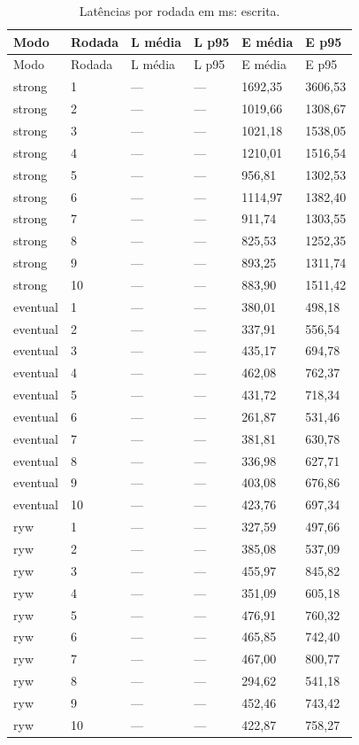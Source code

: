 \begingroup\small\setlength{\tabcolsep}{4pt}
\begin{longtable}{llllll}
\caption{Latências por rodada em ms: escrita.}\\
\toprule
Modo & Rodada & L média & L p95 & E média & E p95\\\midrule\endfirsthead
\toprule
Modo & Rodada & L média & L p95 & E média & E p95\\\midrule\endhead
\bottomrule\endfoot
strong & 1 & --- & --- & 1692,35 & 3606,53\\
strong & 2 & --- & --- & 1019,66 & 1308,67\\
strong & 3 & --- & --- & 1021,18 & 1538,05\\
strong & 4 & --- & --- & 1210,01 & 1516,54\\
strong & 5 & --- & --- & 956,81 & 1302,53\\
strong & 6 & --- & --- & 1114,97 & 1382,40\\
strong & 7 & --- & --- & 911,74 & 1303,55\\
strong & 8 & --- & --- & 825,53 & 1252,35\\
strong & 9 & --- & --- & 893,25 & 1311,74\\
strong & 10 & --- & --- & 883,90 & 1511,42\\
eventual & 1 & --- & --- & 380,01 & 498,18\\
eventual & 2 & --- & --- & 337,91 & 556,54\\
eventual & 3 & --- & --- & 435,17 & 694,78\\
eventual & 4 & --- & --- & 462,08 & 762,37\\
eventual & 5 & --- & --- & 431,72 & 718,34\\
eventual & 6 & --- & --- & 261,87 & 531,46\\
eventual & 7 & --- & --- & 381,81 & 630,78\\
eventual & 8 & --- & --- & 336,98 & 627,71\\
eventual & 9 & --- & --- & 403,08 & 676,86\\
eventual & 10 & --- & --- & 423,76 & 697,34\\
ryw & 1 & --- & --- & 327,59 & 497,66\\
ryw & 2 & --- & --- & 385,08 & 537,09\\
ryw & 3 & --- & --- & 455,97 & 845,82\\
ryw & 4 & --- & --- & 351,09 & 605,18\\
ryw & 5 & --- & --- & 476,91 & 760,32\\
ryw & 6 & --- & --- & 465,85 & 742,40\\
ryw & 7 & --- & --- & 467,00 & 800,77\\
ryw & 8 & --- & --- & 294,62 & 541,18\\
ryw & 9 & --- & --- & 452,46 & 743,42\\
ryw & 10 & --- & --- & 422,87 & 758,27\\
\end{longtable}
\endgroup

